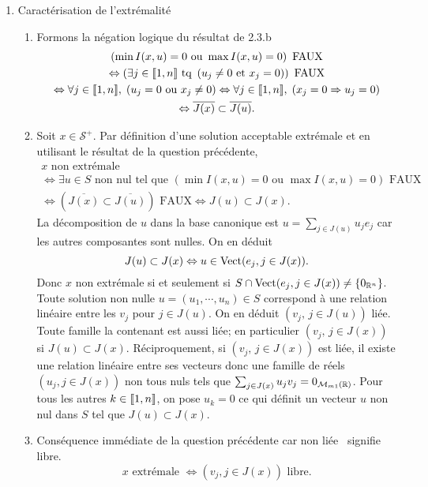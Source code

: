 \begin{enumerate}
  \item Caractérisation de l'extrémalité
  \begin{enumerate}
    \item Formons la négation logique du résultat de 2.3.b
\begin{multline*}
  \left( \min I(x,u) = 0 \text{ ou } \max I(x,u) = 0\right)\text{ FAUX} \\
  \Leftrightarrow
  \left( \exists j \in \llbracket 1,n \rrbracket \text{ tq } \left( u_j \neq 0 \text{ et } x_j = 0\right)\right) \text{ FAUX} \\
  \Leftrightarrow \forall j \in \llbracket 1,n\rrbracket,\; \left( u_j = 0 \text{ ou } x_j \neq 0\right) 
  \Leftrightarrow \forall j \in \llbracket 1,n\rrbracket,\; \left( x_j = 0 \Rightarrow u_j = 0 \right) \\
  \Leftrightarrow \overline{J(x)} \subset \overline{J(u)}.
\end{multline*}

    \item Soit $x \in \mathcal{S}^+$. Par définition d'une solution acceptable extrémale et en utilisant le résultat de la question précédente,
\begin{multline*}
  x \text{ non extrémale } \\
  \Leftrightarrow \exists u \in S \text{ non nul tel que } \left( \min I(x,u) = 0 \text{ ou } \max I(x,u) = 0\right)\text{ FAUX}\\
  \Leftrightarrow \left( \overline{J(x)} \subset \overline{J(u)}\right) \text{ FAUX}
  \Leftrightarrow J(u) \subset J(x).
\end{multline*}
La décomposition de $u$ dans la base canonique est $u = \sum_{j \in J(u)}u_j e_j$ car les autres composantes sont nulles. On en déduit
\[
  J(u) \subset J(x) \Leftrightarrow u \in \operatorname{Vect}(e_j, j\in J(x)).
\]
Donc $x$ non extrémale si et seulement si $S \cap \operatorname{Vect}(e_j, j\in J(x)) \neq \left\lbrace 0_{\mathbb{R}^n}\right\rbrace$.\newline
Toute solution non nulle $u=(u_1, \cdots, u_n) \in S$ correspond à une relation linéaire entre les $v_j$ pour $j \in J(u)$. On en déduit $(v_j, \, j \in J(u))$ liée. Toute famille la contenant est aussi liée; en particulier $(v_j, \, j \in J(x))$ si $J(u) \subset J(x)$.\newline
Réciproquement, si $(v_j, \, j \in J(x))$ est liée, il existe une relation linéaire entre ses vecteurs donc une famille de réels $(u_j, j\in J(x))$ non tous nuls tels que $\sum_{j \in J(x)}u_j v_j = 0_{\mathcal{M}_{m 1}(\mathbb{R})}$. Pour tous les autres $k\in \llbracket 1,n\rrbracket$, on pose $u_k = 0$ ce qui définit un vecteur $u$ non nul dans $S$ tel que $J(u)\subset J(x)$. 
    \item Conséquence immédiate de la question précédente car \og non liée\fg~ signifie \og libre\fg.
\[
  x \text{ extrémale } \Leftrightarrow \left(v_j, j\in J(x)\right) \text{ libre}.
\]
  \end{enumerate}


\end{enumerate}
